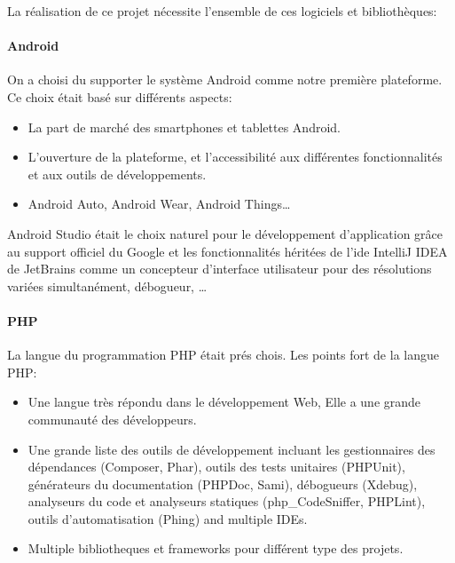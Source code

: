 La réalisation de ce projet nécessite l'ensemble de ces logiciels et
bibliothèques:

\paragraph{Android}

On a choisi du supporter le système Android comme notre première plateforme. Ce
choix était basé sur différents aspects:
\begin{itemize}
    \item La part de marché des smartphones et tablettes Android.
    \item L'ouverture de la plateforme, et l'accessibilité aux différentes
        fonctionnalités et aux outils de développements.
    \item Android Auto, Android Wear, Android Things\ldots
\end{itemize}

Android Studio était le choix naturel pour le développement d'application
grâce au support officiel du Google et les fonctionnalités héritées de l'ide
IntelliJ IDEA de JetBrains comme un concepteur d’interface utilisateur pour
des résolutions variées simultanément, débogueur, \ldots


\paragraph{PHP}
La langue du programmation PHP était prés chois.
Les points fort de la langue PHP:
\begin{itemize}
    \item Une langue très répondu dans le développement Web, Elle a une
        grande communauté des développeurs.
    \item Une grande liste des outils de développement incluant les
        gestionnaires des dépendances (Composer, Phar), outils des tests
        unitaires (PHPUnit), générateurs du documentation (PHPDoc, Sami),
        débogueurs (Xdebug), analyseurs du code et analyseurs statiques
        (php\_CodeSniffer, PHPLint), outils d'automatisation (Phing) and
        multiple IDEs.
    \item Multiple bibliotheques et frameworks pour différent type des projets.
\end{itemize}

